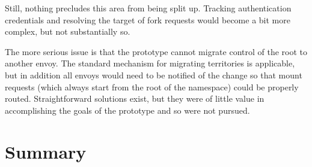 Still, nothing precludes this area from being split up. Tracking authentication credentials and resolving the target of fork requests would become a bit more complex, but not substantially so.

The more serious issue is that the prototype cannot migrate control of the root to another envoy. The standard mechanism for migrating territories is applicable, but in addition all envoys would need to be notified of the change so that mount requests (which always start from the root of the namespace) could be properly routed. Straightforward solutions exist, but they were of little value in accomplishing the goals of the prototype and so were not pursued.

\section{Summary}